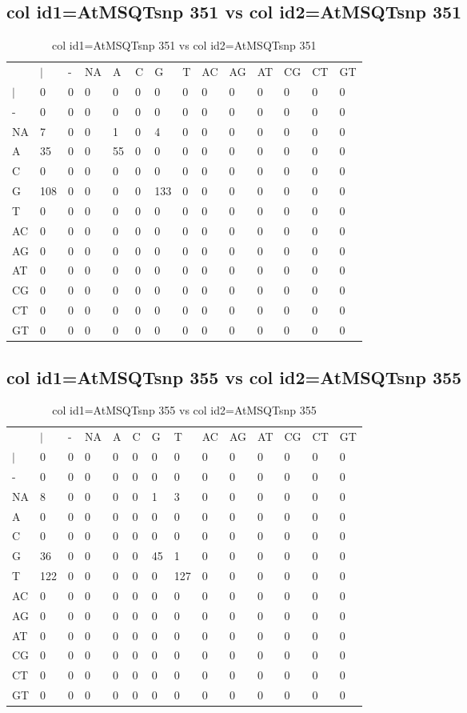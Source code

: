 \subsection{col id1=AtMSQTsnp 351 vs col id2=AtMSQTsnp 351}
\begin{center}
\begin{longtable}{|l|l|l|l|l|l|l|l|l|l|l|l|l|l|}
\caption{col id1=AtMSQTsnp 351 vs col id2=AtMSQTsnp 351} \label{table_dm874}\\
\hline
\\
\hline
&$|$&-&NA&A&C&G&T&AC&AG&AT&CG&CT&GT\\
$|$&0&0&0&0&0&0&0&0&0&0&0&0&0\\
-&0&0&0&0&0&0&0&0&0&0&0&0&0\\
NA&7&0&0&1&0&4&0&0&0&0&0&0&0\\
A&35&0&0&55&0&0&0&0&0&0&0&0&0\\
C&0&0&0&0&0&0&0&0&0&0&0&0&0\\
G&108&0&0&0&0&133&0&0&0&0&0&0&0\\
T&0&0&0&0&0&0&0&0&0&0&0&0&0\\
AC&0&0&0&0&0&0&0&0&0&0&0&0&0\\
AG&0&0&0&0&0&0&0&0&0&0&0&0&0\\
AT&0&0&0&0&0&0&0&0&0&0&0&0&0\\
CG&0&0&0&0&0&0&0&0&0&0&0&0&0\\
CT&0&0&0&0&0&0&0&0&0&0&0&0&0\\
GT&0&0&0&0&0&0&0&0&0&0&0&0&0\\
\hline
\end{longtable}
\end{center}

\subsection{col id1=AtMSQTsnp 355 vs col id2=AtMSQTsnp 355}
\begin{center}
\begin{longtable}{|l|l|l|l|l|l|l|l|l|l|l|l|l|l|}
\caption{col id1=AtMSQTsnp 355 vs col id2=AtMSQTsnp 355} \label{table_dm876}\\
\hline
\\
\hline
&$|$&-&NA&A&C&G&T&AC&AG&AT&CG&CT&GT\\
$|$&0&0&0&0&0&0&0&0&0&0&0&0&0\\
-&0&0&0&0&0&0&0&0&0&0&0&0&0\\
NA&8&0&0&0&0&1&3&0&0&0&0&0&0\\
A&0&0&0&0&0&0&0&0&0&0&0&0&0\\
C&0&0&0&0&0&0&0&0&0&0&0&0&0\\
G&36&0&0&0&0&45&1&0&0&0&0&0&0\\
T&122&0&0&0&0&0&127&0&0&0&0&0&0\\
AC&0&0&0&0&0&0&0&0&0&0&0&0&0\\
AG&0&0&0&0&0&0&0&0&0&0&0&0&0\\
AT&0&0&0&0&0&0&0&0&0&0&0&0&0\\
CG&0&0&0&0&0&0&0&0&0&0&0&0&0\\
CT&0&0&0&0&0&0&0&0&0&0&0&0&0\\
GT&0&0&0&0&0&0&0&0&0&0&0&0&0\\
\hline
\end{longtable}
\end{center}

